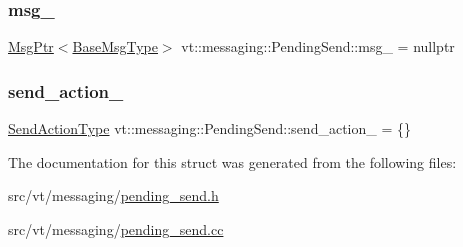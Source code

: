 \subsubsection{\texorpdfstring{msg\+\_\+}{msg\_}}
{\footnotesize\ttfamily \hyperlink{namespacevt_a9f5ebd62ee9d6dd8829e3e1cc4f858e9}{Msg\+Ptr}$<$\hyperlink{namespacevt_a44d0d4e144748f2b19a1cfd962f50338}{Base\+Msg\+Type}$>$ vt\+::messaging\+::\+Pending\+Send\+::msg\+\_\+ = nullptr\hspace{0.3cm}{\ttfamily [private]}}

\mbox{\label{structvt_1_1messaging_1_1_pending_send_a0054d2fec8353438284dc02a28a73294}} 
\subsubsection{\texorpdfstring{send\+\_\+action\+\_\+}{send\_action\_}}
{\footnotesize\ttfamily \hyperlink{structvt_1_1messaging_1_1_pending_send_aa13248a342d68230048cde8e0756851c}{Send\+Action\+Type} vt\+::messaging\+::\+Pending\+Send\+::send\+\_\+action\+\_\+ = \{\}\hspace{0.3cm}{\ttfamily [private]}}



The documentation for this struct was generated from the following files\+:\begin{DoxyCompactItemize}
\item 
src/vt/messaging/\hyperlink{pending__send_8h}{pending\+\_\+send.\+h}\item 
src/vt/messaging/\hyperlink{pending__send_8cc}{pending\+\_\+send.\+cc}\end{DoxyCompactItemize}
